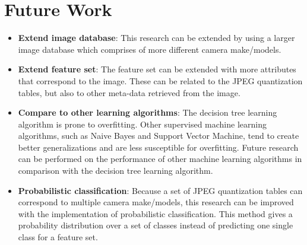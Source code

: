 \section{Future Work}\label{sec:fut}
\begin{itemize}
\item \textbf{Extend image database}: This research can be extended by using a larger image database which comprises of more different camera make/models.
\item \textbf{Extend feature set}: The feature set can be extended with more attributes that correspond to the image. These can be related to the JPEG quantization tables, but also to other meta-data retrieved from the image.
\item \textbf{Compare to other learning algorithms}: The decision tree learning algorithm is prone to overfitting. Other supervised machine learning algorithms, such as Naive Bayes and Support Vector Machine, tend to create better generalizations and are less susceptible for overfitting. Future research can be performed on the performance of other machine learning algorithms in comparison with the decision tree learning algorithm.
\item \textbf{Probabilistic classification}: Because a set of JPEG quantization tables can correspond to multiple camera make/models, this research can be improved with the implementation of probabilistic classification. This method gives a probability distribution over a set of classes instead of predicting one single class for a feature set.

\end{itemize}
\iffalse
